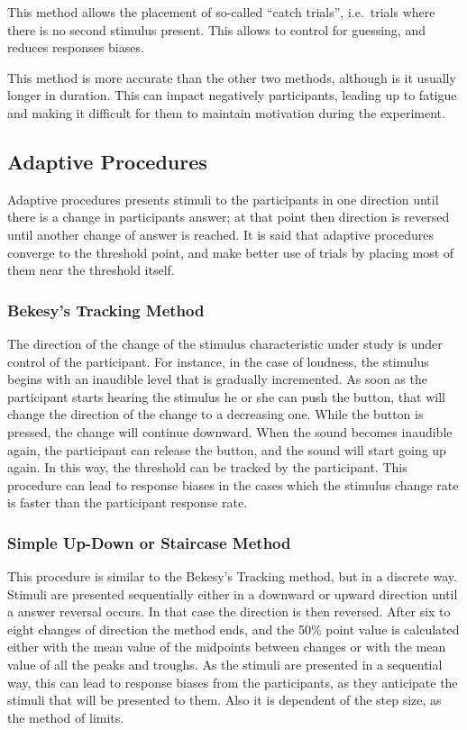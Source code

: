This method allows the placement of so-called ``catch trials'', i.e.\ trials
where there is no second stimulus present. This allows to control for guessing,
and reduces responses biases.

This method is more accurate than the other two methods, although is it usually
longer in duration. This can impact negatively participants, leading up to
fatigue and making it difficult for them to maintain motivation during the
experiment.

\subsection{Adaptive Procedures}

Adaptive procedures presents stimuli to the participants in one direction until
there is a change in participants answer; at that point then direction is
reversed until another change of answer is reached. It is said that adaptive
procedures converge to the threshold point, and make better use of trials by
placing most of them near the threshold itself.

\subsubsection{Bekesy's Tracking Method}

The direction of the change of the stimulus characteristic under study is under
control of the participant. For instance, in the case of loudness, the stimulus
begins with an inaudible level that is gradually incremented. As soon as the
participant starts hearing the stimulus he or she can push the button, that will
change the direction of the change to a decreasing one. While the button is
pressed, the change will continue downward. When the sound becomes inaudible
again, the participant can release the button, and the sound will start going
up again. In this way, the threshold can be tracked by the participant. This
procedure can lead to response biases in the cases which the stimulus change
rate is faster than the participant response rate.

\subsubsection{Simple Up-Down or Staircase Method}

This procedure is similar to the Bekesy's Tracking method, but in a discrete
way. Stimuli are presented sequentially either in a downward or upward direction
until a answer reversal occurs. In that case the direction is then reversed.
After six to eight changes of direction the method ends, and the 50\% point
value is calculated either with the mean value of the midpoints between changes
or with the mean value of all the peaks and troughs. As the stimuli are
presented in a sequential way, this can lead to response biases from the
participants, as they anticipate the stimuli that will be presented to them.
Also it is dependent of the step size, as the method of limits.

